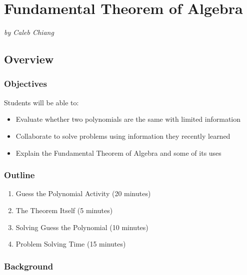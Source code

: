 \chapter{Fundamental Theorem of Algebra}

\emph{by Caleb Chiang}

\section{Overview}

\subsection{Objectives}

Students will be able to:
\begin{itemize}
    \item Evaluate whether two polynomials are the same with limited information
    \item Collaborate to solve problems using information they recently learned
    \item Explain the Fundamental Theorem of Algebra and some of its uses
\end{itemize}

\subsection{Outline}

\begin{enumerate}
    \item Guess the Polynomial Activity (20 minutes)
    \item The Theorem Itself (5 minutes)
    \item Solving Guess the Polynomial (10 minutes)
    \item Problem Solving Time (15 minutes)
\end{enumerate}

\subsection{Background}

